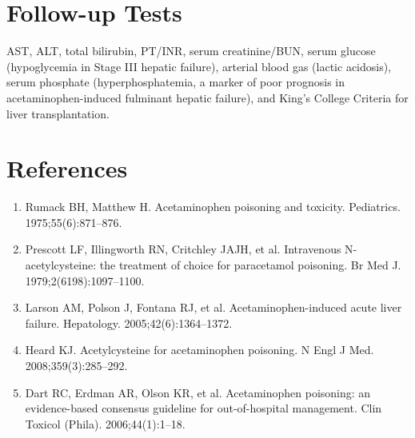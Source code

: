 \section*{Follow-up Tests}
AST, ALT, total bilirubin, PT/INR, serum creatinine/BUN, serum glucose (hypoglycemia in Stage III hepatic failure), arterial blood gas (lactic acidosis), serum phosphate (hyperphosphatemia, a marker of poor prognosis in acetaminophen-induced fulminant hepatic failure), and King's College Criteria for liver transplantation.
\section*{References}
\begin{enumerate}
  \item Rumack BH, Matthew H. Acetaminophen poisoning and toxicity. Pediatrics. 1975;55(6):871--876.
  \item Prescott LF, Illingworth RN, Critchley JAJH, et al. Intravenous N-acetylcysteine: the treatment of choice for paracetamol poisoning. Br Med J. 1979;2(6198):1097--1100.
  \item Larson AM, Polson J, Fontana RJ, et al. Acetaminophen-induced acute liver failure. Hepatology. 2005;42(6):1364--1372.
  \item Heard KJ. Acetylcysteine for acetaminophen poisoning. N Engl J Med. 2008;359(3):285--292.
  \item Dart RC, Erdman AR, Olson KR, et al. Acetaminophen poisoning: an evidence-based consensus guideline for out-of-hospital management. Clin Toxicol (Phila). 2006;44(1):1--18.
\end{enumerate}
\clearpage
